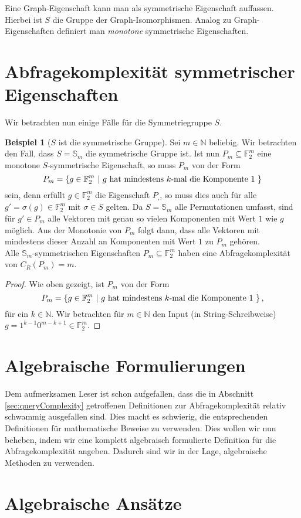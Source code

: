 \documentclass[10pt,a4paper]{scrreprt}
\theoremstyle{definition}
\newtheorem{examplex}{Beispiel}
\newenvironment{example}[1]
{ \begin{leftbar} \begin{examplex}#1}
{ \end{examplex} \ignorespacesafterend \end{leftbar} }
\begin{document}
Eine Graph-Eigenschaft kann man als symmetrische
Eigenschaft auffassen. Hierbei ist $S$ die Gruppe
der Graph-Isomorphismen.
Analog zu Graph-Eigenschaften definiert man
\emph{monotone} symmetrische Eigenschaften.

\section{Abfragekomplexität symmetrischer Eigenschaften}
Wir betrachten nun einige Fälle für die Symmetriegruppe
$S$.
\begin{example}[$S$ ist die symmetrische Gruppe]
Sei $m\in \mathbb{N}$ beliebig.
Wir betrachten den Fall, dass $S=\mathbb{S}_m$
die symmetrische Gruppe ist. Ist nun 
$P_m\subseteq \mathbb{F}_2^m$ eine monotone 
$S$-symmetrische Eigenschaft, so muss 
$P_m$ von der Form 
$$ P_m= \{ g\in \mathbb{F}_2^m \ |
\ g \textup{ hat mindestens } k\textup{-mal die Komponente } 1 \ \}$$
sein, denn erfüllt $g\in \mathbb{F}_2^m$ die Eigenschaft
$P_,$, so muss dies auch für alle $g'=\sigma(g)\in\mathbb{F}_2^m$
mit $\sigma\in S$ gelten. Da $S=\mathbb{S}_m$ alle Permutationen
umfasst, sind für $g'\in P_m$ alle Vektoren mit
genau so vielen Komponenten mit Wert $1$ wie $g$ möglich. Aus der
Monotonie von $P_m$ folgt dann, dass alle Vektoren mit
mindestens dieser Anzahl an Komponenten mit Wert $1$ zu
$P_m$ gehören. \\
Alle $\mathbb{S}_m$-symmetrischen Eigenschaften 
$P_m \subseteq \mathbb{F}_2^m$ haben eine Abfragekomplexität
von $C_R(P_m) = m$.
\begin{proof}
Wie oben gezeigt, ist $P_m$ von der Form
$$ P_m= \{ g\in \mathbb{F}_2^m \ |
\ g \textup{ hat mindestens } k\textup{-mal die Komponente } 1 \ \}\,,$$
für ein $k\in \mathbb{N}$.
Wir betrachten für $m\in\mathbb{N}$ den Input (in String-Schreibweise)
$g=1^{k-1}0^{m-k+1}\in \mathbb{F}_2^m$. 
\end{proof}
\end{example}

\section{Algebraische Formulierungen}
Dem aufmerksamen Leser ist schon aufgefallen, dass die in 
Abschnitt \ref{sec:queryComplexity} getroffenen Definitionen
zur Abfragekomplexität relativ schwammig ausgefallen sind.
Dies macht es schwierig, die entsprechenden Definitionen
für mathematische Beweise zu verwenden.
Dies wollen wir nun beheben, indem wir eine komplett algebraisch
formulierte Definition für die Abfragekomplexität angeben.
Dadurch sind wir in der Lage, algebraische Methoden zu verwenden.


\section{Algebraische Ansätze}


\printbibliography
\end{document}
